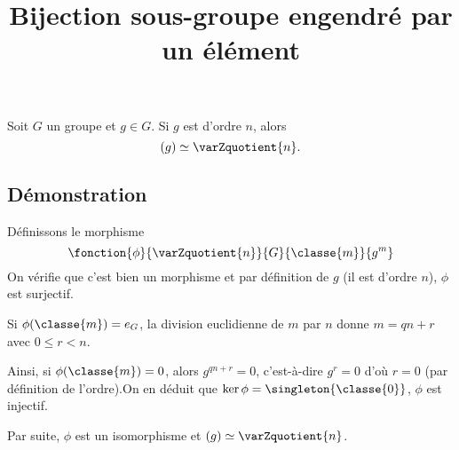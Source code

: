 \documentclass[fontsize=12pt,twoside=false,parskip=half]{scrartcl}
\title{Bijection sous-groupe engendré par un élément}
\date{}
\author{}
\begin{document}
\maketitle
   \begin{Theoreme}
      Soit $G$ un groupe et $g \in G$. Si $g$ est d’ordre $n$, alors 
      \[
         (g) \simeq \varZquotient{n}.
      \]
   \end{Theoreme}
   \subsection{Démonstration}
      Définissons le morphisme
      \[
         \fonction{\phi}{\varZquotient{n}}{G}{\classe{m}}{g^m}
      \]
      On vérifie que c’est bien un morphisme et par définition de $g$ 
      (il est d’ordre $n$), $\phi$ est surjectif.
      
      Si $\phi(\classe{m}) = e_G$, la division euclidienne de $m$ par $n$ donne
      $m = qn + r$ avec $0 \leq r < n$.
      
      Ainsi, si $\phi(\classe{m}) = 0$, alors $g^{qn + r} = 0$, c’est-à-dire
      $g^r = 0$ d’où $r = 0$ (par définition de l’ordre).On en déduit que 
      $\ker \phi = \singleton{\classe{0}}$, $\phi$ est injectif.
      
      Par suite, $\phi$ est un isomorphisme et $(g) \simeq \varZquotient{n}$.
\end{document}
